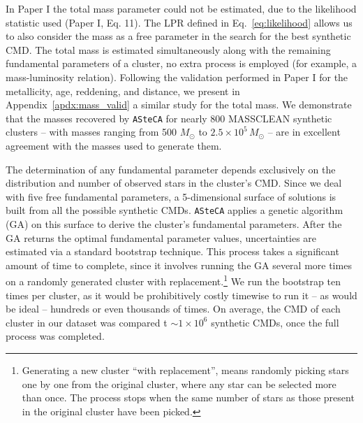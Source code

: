 \documentclass{aa}
\begin{document}
%
In Paper I the total mass parameter could not be estimated, due to the
likelihood statistic used (Paper I, Eq. 11). The LPR defined in
Eq.~\ref{eq:likelihood} allows us to also consider the mass as a free parameter
in the search for the best synthetic CMD.\@
%
The total mass is estimated simultaneously along with the remaining
fundamental parameters of a cluster, no extra process is employed (for example,
a mass-luminosity relation).
%
Following the validation performed in Paper I for the metallicity, age,
reddening, and distance, we present in Appendix~\ref{apdx:mass_valid} a
similar study for the total mass. We demonstrate that the masses recovered by
\texttt{ASteCA} for nearly 800 MASSCLEAN synthetic clusters -- with
masses ranging from 500 $M_{\odot}$ to $2.5\times10^5\,M_{\odot}$ -- are in
excellent agreement with the masses used to generate them.

The determination of any fundamental parameter depends exclusively on
the distribution and number of observed stars in the cluster's CMD.
Since we deal with five free fundamental parameters, a 5-dimensional surface of
solutions is built from all the possible synthetic CMDs.
\texttt{ASteCA} applies a genetic algorithm (GA) on this surface to derive the
cluster's fundamental parameters.
%
%
After the GA returns the optimal fundamental parameter values, uncertainties are
estimated via a standard bootstrap technique. This process takes a significant
amount of time to complete, since it involves running the GA several more times
on a randomly generated cluster with replacement.\footnote{Generating a new
cluster ``with replacement'', means randomly picking stars one by one from the
original cluster, where any star can be selected more than once. The process
stops when the same number of stars as those present in the original cluster
have been picked.}
We run the bootstrap ten times per cluster, as it would be prohibitively
costly timewise to run it -- as would be ideal -- hundreds or even thousands of
times.
On average, the CMD of each cluster in our dataset was compared t
${\sim}1{\times}10^6$ synthetic CMDs, once the full process was completed.
\end{document}

